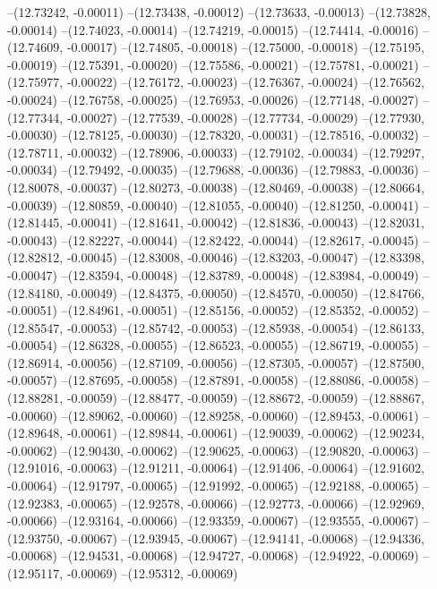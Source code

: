 --(12.73242, -0.00011)
--(12.73438, -0.00012)
--(12.73633, -0.00013)
--(12.73828, -0.00014)
--(12.74023, -0.00014)
--(12.74219, -0.00015)
--(12.74414, -0.00016)
--(12.74609, -0.00017)
--(12.74805, -0.00018)
--(12.75000, -0.00018)
--(12.75195, -0.00019)
--(12.75391, -0.00020)
--(12.75586, -0.00021)
--(12.75781, -0.00021)
--(12.75977, -0.00022)
--(12.76172, -0.00023)
--(12.76367, -0.00024)
--(12.76562, -0.00024)
--(12.76758, -0.00025)
--(12.76953, -0.00026)
--(12.77148, -0.00027)
--(12.77344, -0.00027)
--(12.77539, -0.00028)
--(12.77734, -0.00029)
--(12.77930, -0.00030)
--(12.78125, -0.00030)
--(12.78320, -0.00031)
--(12.78516, -0.00032)
--(12.78711, -0.00032)
--(12.78906, -0.00033)
--(12.79102, -0.00034)
--(12.79297, -0.00034)
--(12.79492, -0.00035)
--(12.79688, -0.00036)
--(12.79883, -0.00036)
--(12.80078, -0.00037)
--(12.80273, -0.00038)
--(12.80469, -0.00038)
--(12.80664, -0.00039)
--(12.80859, -0.00040)
--(12.81055, -0.00040)
--(12.81250, -0.00041)
--(12.81445, -0.00041)
--(12.81641, -0.00042)
--(12.81836, -0.00043)
--(12.82031, -0.00043)
--(12.82227, -0.00044)
--(12.82422, -0.00044)
--(12.82617, -0.00045)
--(12.82812, -0.00045)
--(12.83008, -0.00046)
--(12.83203, -0.00047)
--(12.83398, -0.00047)
--(12.83594, -0.00048)
--(12.83789, -0.00048)
--(12.83984, -0.00049)
--(12.84180, -0.00049)
--(12.84375, -0.00050)
--(12.84570, -0.00050)
--(12.84766, -0.00051)
--(12.84961, -0.00051)
--(12.85156, -0.00052)
--(12.85352, -0.00052)
--(12.85547, -0.00053)
--(12.85742, -0.00053)
--(12.85938, -0.00054)
--(12.86133, -0.00054)
--(12.86328, -0.00055)
--(12.86523, -0.00055)
--(12.86719, -0.00055)
--(12.86914, -0.00056)
--(12.87109, -0.00056)
--(12.87305, -0.00057)
--(12.87500, -0.00057)
--(12.87695, -0.00058)
--(12.87891, -0.00058)
--(12.88086, -0.00058)
--(12.88281, -0.00059)
--(12.88477, -0.00059)
--(12.88672, -0.00059)
--(12.88867, -0.00060)
--(12.89062, -0.00060)
--(12.89258, -0.00060)
--(12.89453, -0.00061)
--(12.89648, -0.00061)
--(12.89844, -0.00061)
--(12.90039, -0.00062)
--(12.90234, -0.00062)
--(12.90430, -0.00062)
--(12.90625, -0.00063)
--(12.90820, -0.00063)
--(12.91016, -0.00063)
--(12.91211, -0.00064)
--(12.91406, -0.00064)
--(12.91602, -0.00064)
--(12.91797, -0.00065)
--(12.91992, -0.00065)
--(12.92188, -0.00065)
--(12.92383, -0.00065)
--(12.92578, -0.00066)
--(12.92773, -0.00066)
--(12.92969, -0.00066)
--(12.93164, -0.00066)
--(12.93359, -0.00067)
--(12.93555, -0.00067)
--(12.93750, -0.00067)
--(12.93945, -0.00067)
--(12.94141, -0.00068)
--(12.94336, -0.00068)
--(12.94531, -0.00068)
--(12.94727, -0.00068)
--(12.94922, -0.00069)
--(12.95117, -0.00069)
--(12.95312, -0.00069)
